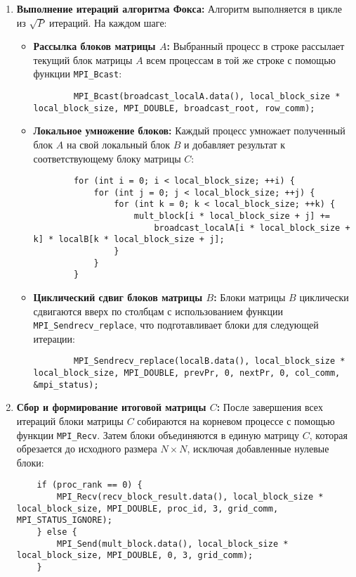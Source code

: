 \documentclass{report}
\begin{document}
\begin{enumerate}
    \item \textbf{Выполнение итераций алгоритма Фокса:}  
    Алгоритм выполняется в цикле из $\sqrt{P}$ итераций. На каждом шаге:
    \begin{itemize}
        \item \textbf{Рассылка блоков матрицы $A$:} Выбранный процесс в строке рассылает текущий блок матрицы $A$ всем процессам в той же строке с помощью функции \texttt{MPI\_Bcast}:
        \begin{lstlisting}
        MPI_Bcast(broadcast_localA.data(), local_block_size * local_block_size, MPI_DOUBLE, broadcast_root, row_comm);
        \end{lstlisting}

        \item \textbf{Локальное умножение блоков:} Каждый процесс умножает полученный блок $A$ на свой локальный блок $B$ и добавляет результат к соответствующему блоку матрицы $C$:
        \begin{lstlisting}
        for (int i = 0; i < local_block_size; ++i) {
            for (int j = 0; j < local_block_size; ++j) {
                for (int k = 0; k < local_block_size; ++k) {
                    mult_block[i * local_block_size + j] +=
                        broadcast_localA[i * local_block_size + k] * localB[k * local_block_size + j];
                }
            }
        }
        \end{lstlisting}

        \item \textbf{Циклический сдвиг блоков матрицы $B$:} Блоки матрицы $B$ циклически сдвигаются вверх по столбцам с использованием функции \texttt{MPI\_Sendrecv\_replace}, что подготавливает блоки для следующей итерации:
        \begin{lstlisting}
        MPI_Sendrecv_replace(localB.data(), local_block_size * local_block_size, MPI_DOUBLE, prevPr, 0, nextPr, 0, col_comm, &mpi_status);
        \end{lstlisting}
    \end{itemize}

    \item \textbf{Сбор и формирование итоговой матрицы $C$:}  
    После завершения всех итераций блоки матрицы $C$ собираются на корневом процессе с помощью функции \texttt{MPI\_Recv}. Затем блоки объединяются в единую матрицу $C$, которая обрезается до исходного размера $N \times N$, исключая добавленные нулевые блоки:
    \begin{lstlisting}
    if (proc_rank == 0) {
        MPI_Recv(recv_block_result.data(), local_block_size * local_block_size, MPI_DOUBLE, proc_id, 3, grid_comm, MPI_STATUS_IGNORE);
    } else {
        MPI_Send(mult_block.data(), local_block_size * local_block_size, MPI_DOUBLE, 0, 3, grid_comm);
    }
    \end{lstlisting}
\end{enumerate}
\end{document}
